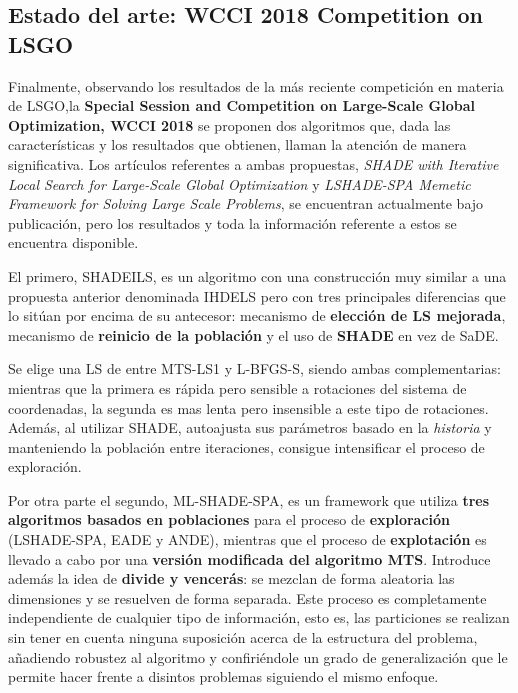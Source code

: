 \subsection{Estado del arte: WCCI 2018 Competition on LSGO}

Finalmente, observando los resultados de la más reciente competición en materia de LSGO,la \textbf{Special Session and Competition on Large-Scale Global Optimization, WCCI 2018} se proponen dos algoritmos que, dada las características y los resultados que obtienen, llaman la atención de manera significativa. Los artículos referentes a ambas propuestas, \textit{SHADE with Iterative Local Search for Large-Scale Global Optimization}\cite{SHADEILS} y \textit{LSHADE-SPA Memetic Framework for Solving Large Scale Problems}\cite{ML-SHADE-SPA}, se encuentran actualmente bajo publicación, pero los resultados y toda la información referente a estos se encuentra disponible.

El primero, SHADEILS, es un algoritmo con una construcción muy similar a una propuesta anterior denominada IHDELS\cite{IHDELS} pero con tres principales diferencias que lo sitúan por encima de su antecesor: mecanismo de \textbf{elección de LS mejorada}, mecanismo de \textbf{reinicio de la población} y el uso de \textbf{SHADE}\cite{SHADE} en vez de SaDE. 

Se elige una LS de entre  MTS-LS1\cite{MTS-LSGO} y L-BFGS-S\cite{LBFGSB}, siendo ambas complementarias: mientras que la primera es rápida pero sensible a rotaciones del sistema de coordenadas, la segunda es mas lenta pero insensible a este tipo de rotaciones. Además, al utilizar SHADE, autoajusta sus parámetros basado en la \textit{historia} y manteniendo la población entre iteraciones, consigue intensificar el proceso de exploración. 

Por otra parte el segundo, ML-SHADE-SPA, es un framework que utiliza \textbf{tres algoritmos basados en poblaciones} para el proceso de \textbf{exploración} (LSHADE-SPA, EADE y ANDE), mientras que el proceso de \textbf{explotación} es llevado a cabo por una \textbf{versión modificada del algoritmo MTS}. Introduce además la idea de \textbf{divide y vencerás}: se mezclan de forma aleatoria las dimensiones y se resuelven de forma separada. Este proceso es completamente independiente de cualquier tipo de información, esto es, las particiones se realizan sin tener en cuenta ninguna suposición acerca de la estructura del problema, añadiendo robustez al algoritmo y confiriéndole un grado de generalización que le permite hacer frente a disintos problemas siguiendo el mismo enfoque.

